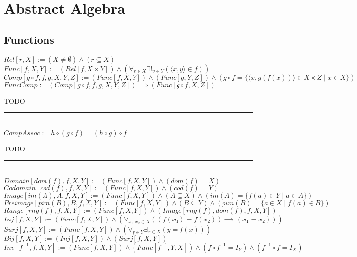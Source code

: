 \documentclass{book}
\newcommand{\abr}{:=}
\newcommand{\pr}[1]{\left(#1\right)}
\newcommand{\st}{\mathbin{|}}
\begin{document}
\newpage
\newpage
\newpage


\chapter{Abstract Algebra}
\section{Functions}
$Rel[r, X] \abr (X \neq \emptyset) \land (r \subseteq X)$ \\
$Func[f, X, Y] \abr (Rel[f, X \times Y]) \land \pr{\forall_{x \in X} \exists!_{y \in Y}(\langle x, y \rangle \in f)}$ \\
$Comp[g \circ f, f, g, X, Y, Z] \abr (Func[f, X, Y]) \land (Func[g, Y, Z]) \land \pr{g \circ f = \{\langle x, g\pr{f(x)} \rangle \in X \times Z \st x \in X\}}$ \\

$FuncComp \abr (Comp[g \circ f, f, g, X, Y, Z]) \implies (Func[g \circ f, X, Z])$
\begin{enumerate}
  \lit TODO
\end{enumerate} \vspace{.75mm} \hrule \vspace{.75mm} \ \\

$CompAssoc \abr h \circ (g \circ f) = (h \circ g) \circ f$
\begin{enumerate}
  \lit TODO
\end{enumerate} \vspace{.75mm} \hrule \vspace{.75mm} \ \\

$Domain[dom(f), f, X, Y] \abr (Func[f, X, Y]) \land \pr{dom(f) = X}$ \\
$Codomain[cod(f), f, X, Y] \abr (Func[f, X, Y]) \land \pr{cod(f) = Y}$ \\
$Image[im(A), A, f, X, Y] \abr (Func[f, X, Y]) \land (A \subseteq X) \land \pr{im(A) = \{f(a) \in Y \st a \in A\}}$ \\
$Preimage[pim(B), B, f, X, Y] \abr (Func[f, X, Y]) \land (B \subseteq Y) \land \pr{pim(B) = \{a \in X \st f(a) \in B\}}$ \\
$Range[rng(f), f, X, Y] \abr (Func[f, X, Y]) \land \pr{Image[rng(f), dom(f), f, X, Y]}$ \\

$Inj[f, X, Y] \abr (Func[f, X, Y]) \land \pr{\forall_{x_1, x_2 \in X}\pr{\pr{f(x_1) = f(x_2)} \implies (x_1 = x_2)}}$ \\%
$Surj[f, X, Y] \abr (Func[f, X, Y]) \land \pr{\forall_{y \in Y} \exists_{x \in X}\pr{y = f(x)}}$ \\%
$Bij[f, X, Y] \abr (Inj[f, X, Y]) \land (Surj[f, X, Y])$ \\%
$Inv[f^{-1}, f, X, Y] \abr (Func[f, X, Y]) \land (Func[f^{-1}, Y, X]) \land (f \circ f^{-1} = I_Y) \land (f^{-1} \circ f = I_X)$ \\
\end{document}
